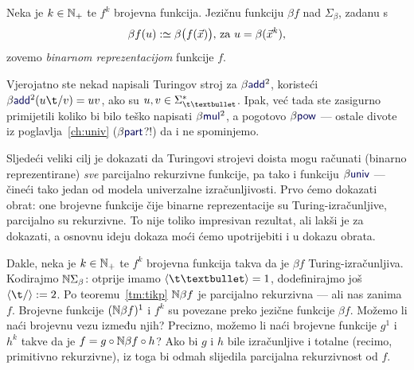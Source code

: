 \begin{definicija}[{name=[binarna reprezentacija brojevne funkcije]}]
Neka je $k\in{\mathbb N}_+$ te $f^k$ brojevna funkcija. Jezičnu funkciju $\beta f$ nad $\Sigma_\beta$, zadanu s
\begin{equation}\label{eq:betaf}
  \beta f(u):\simeq\beta\bigl(f(\vec x)\bigr)\text{, za } u=\beta(\vec x^k)\text,
\end{equation}
zovemo \emph{binarnom reprezentacijom} funkcije $f$.
\end{definicija}

Vjerojatno ste nekad napisali Turingov stroj za $\beta\f{add}^2$, koristeći $\beta\f{add}^2(u\t/v)=uv$, ako su $u,v\in\Sigma_{\t\textbullet}^*$. Ipak, već tada ste zasigurno primijetili koliko bi bilo teško napisati $\beta\f{mul}^2$, a pogotovo $\beta\f{pow}$ --- ostale divote iz poglavlja~\ref{ch:univ} ($\beta\f{part}$?!) da i ne spominjemo.

Sljedeći veliki cilj je dokazati da Turingovi strojevi doista mogu računati (binarno reprezentirane) \emph{sve} parcijalno rekurzivne funkcije, pa tako i funkciju $\beta\f{univ}$ --- čineći tako jedan od modela univerzalne izračunljivosti. Prvo ćemo dokazati obrat: one brojevne funkcije čije binarne reprezentacije su Turing-izračunljive, parcijalno su rekurzivne. To nije toliko impresivan rezultat, ali lakši je za dokazati, a osnovnu ideju dokaza moći ćemo upotrijebiti i u dokazu obrata.


Dakle, neka je $k\in{\mathbb N}_+$ te $f^k$ brojevna funkcija takva da je $\beta f$ Turing-izračunljiva. Kodirajmo ${\mathbb N}\Sigma_\beta$: otprije imamo $\kr{\t\textbullet}=1$, dodefinirajmo još $\kr{\t/}:=2$.
Po teoremu~\ref{tm:tikp} ${\mathbb N}\beta f$ je parcijalno rekurzivna --- ali nas zanima $f$. Brojevne funkcije $({\mathbb N}\beta f)^1$ i $f^k$ su povezane preko jezične funkcije $\beta f$. Možemo li naći brojevnu vezu između njih? Precizno, možemo li naći brojevne funkcije $g^1$ i $h^k$ takve da je $f=g\circ{\mathbb N}\beta f\circ h$? Ako bi $g$ i $h$ bile izračunljive i totalne (recimo, primitivno rekurzivne), iz toga bi odmah slijedila parcijalna rekurzivnost od $f$.%

